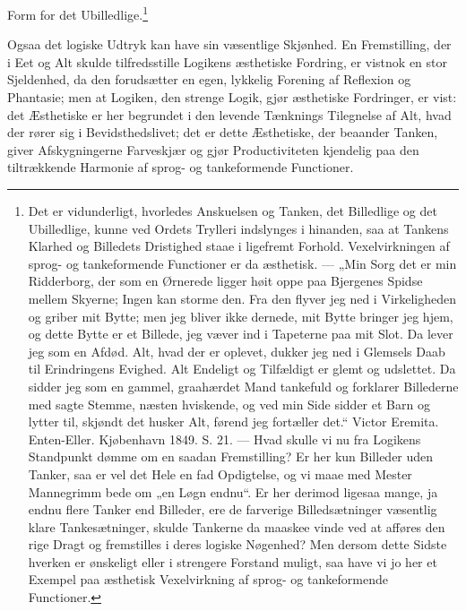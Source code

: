 \documentclass[12pt]{book}
\newcommand{\opage}[1]{\marginnote{\footnotesize\textit{[#1]}}}
\begin{document}
Form for det Ubilledlige.\footnote{%
Det er vidunderligt, hvorledes Anskuelsen og Tanken, det Billedlige
og det Ubilledlige, kunne ved Ordets Trylleri indslynges i
hinanden, saa at Tankens Klarhed og Billedets Dristighed staae i
ligefremt Forhold. Vexelvirkningen af sprog- og tankeformende Functioner
er da æsthetisk. --- „Min Sorg det er min Ridderborg, der som
en Ørnerede ligger høit oppe paa Bjergenes Spidse mellem Skyerne;
Ingen kan storme den. Fra den flyver jeg ned i Virkeligheden og
griber mit Bytte; men jeg bliver ikke dernede, mit Bytte bringer
jeg hjem, og dette Bytte er et Billede, jeg væver ind i Tapeterne
paa mit Slot. Da lever jeg som en Afdød. Alt, hvad der er
oplevet, dukker jeg ned i Glemsels Daab til Erindringens Evighed.
Alt Endeligt og Tilfældigt er glemt og udslettet. Da sidder jeg
som en gammel, graahærdet Mand tankefuld og forklarer Billederne
med sagte Stemme, næsten hviskende, og ved min Side sidder
et Barn og lytter til, skjøndt det husker Alt, førend jeg fortæller
det.“ Victor Eremita. Enten-Eller. Kjøbenhavn 1849.
S. 21. --- Hvad skulle vi nu fra Logikens Standpunkt dømme
om en saadan Fremstilling? Er her kun Billeder uden Tanker,
saa er vel det Hele en fad Opdigtelse, og vi maae med Mester
Mannegrimm bede om „en Løgn endnu“. Er her derimod ligesaa
mange, ja endnu flere Tanker end Billeder, ere de farverige
Billedsætninger væsentlig klare Tankesætninger, skulde Tankerne
da maaskee vinde ved at afføres den rige Dragt og fremstilles
i deres logiske Nøgenhed? Men dersom dette Sidste hverken
er ønskeligt eller i strengere Forstand muligt, saa have vi jo her
et Exempel paa æsthetisk Vexelvirkning af sprog- og tankeformende
Functioner.}

\opage{70}Ogsaa det logiske Udtryk kan have sin væsentlige Skjønhed.
En Fremstilling, der i Eet og Alt skulde tilfredsstille
Logikens æsthetiske Fordring, er vistnok en stor Sjeldenhed,
da den forudsætter en egen, lykkelig Forening af Reflexion og
Phantasie; men at Logiken, den strenge Logik, gjør æsthetiske
Fordringer, er vist: det Æsthetiske er her begrundet i den
levende Tænknings Tilegnelse af Alt, hvad der rører sig i
Bevidsthedslivet; det er dette Æsthetiske, der beaander Tanken,
giver Afskygningerne Farveskjær og gjør Productiviteten kjendelig
paa den tiltrækkende Harmonie af sprog- og tankeformende
Functioner.
\end{document}
